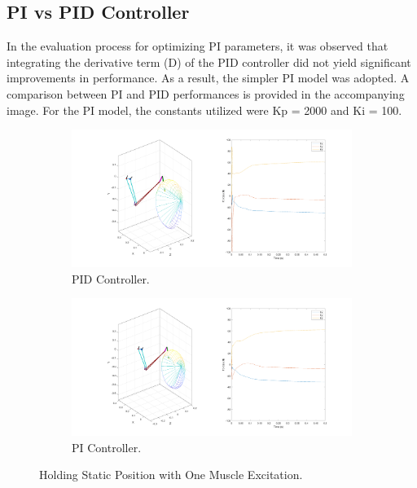 \subsection{PI vs PID Controller}

In the evaluation process for optimizing PI parameters, it was observed that integrating the derivative term (D) of the PID controller did not yield significant improvements in performance. As a result, the simpler PI model was adopted. A comparison between PI and PID performances is provided in the accompanying image. For the PI model, the constants utilized were Kp = 2000 and Ki = 100.

\begin{figure}[h!] 
    \centering
    \begin{subfigure}[b]{0.8\linewidth}
       \includegraphics[width=\linewidth]{Pictures/Results/PIDController_NeuralExcitation.png}
        \caption{PID Controller.}
    \end{subfigure}

    \vspace{1cm} %
    \begin{subfigure}[b]{0.8\linewidth}            
        \includegraphics[width=\linewidth]{Pictures/Results/PIController_NeuralExcitation.png}
        \caption{PI Controller.}
    \end{subfigure}

    \caption{Holding Static Position with One Muscle Excitation.}

\end{figure}

